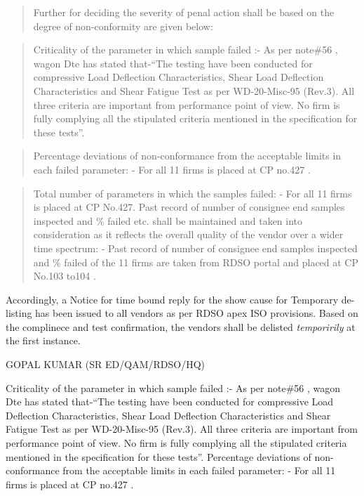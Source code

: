 \documentclass[nofonts,]{tufte-book}
\begin{document}
\begin{quote}
Further for deciding the severity of penal action shall be based on the
degree of non-conformity are given below:
\end{quote}

\begin{quote}
Criticality of the parameter in which sample failed :- As per note\#56 ,
wagon Dte has stated that-``The testing have been conducted for
compressive Load Deflection Characteristics, Shear Load Deflection
Characteristics and Shear Fatigue Test as per WD-20-Misc-95 (Rev.3). All
three criteria are important from performance point of view. No firm is
fully complying all the stipulated criteria mentioned in the
specification for these tests''.
\end{quote}

\begin{quote}
Percentage deviations of non-conformance from the acceptable limits in
each failed parameter: - For all 11 firms is placed at CP no.427 .
\end{quote}

\begin{quote}
Total number of parameters in which the samples failed: - For all 11
firms is placed at CP No.427. Past record of number of consignee end
samples inspected and \% failed etc. shall be maintained and taken into
consideration as it reflects the overall quality of the vendor over a
wider time spectrum: - Past record of number of consignee end samples
inspected and \% failed of the 11 firms are taken from RDSO portal and
placed at CP No.103 to104 .
\end{quote}

Accordingly, a Notice for time bound reply for the show cause for
Temporary de-listing has been issued to all vendors as per RDSO apex ISO
provisions. Based on the complinece and test confirmation, the vendors
shall be delisted \emph{temporirily} at the first instance.

GOPAL KUMAR (SR ED/QAM/RDSO/HQ)

Criticality of the parameter in which sample failed :- As per note\#56 ,
wagon Dte has stated that-``The testing have been conducted for
compressive Load Deflection Characteristics, Shear Load Deflection
Characteristics and Shear Fatigue Test as per WD-20-Misc-95 (Rev.3). All
three criteria are important from performance point of view. No firm is
fully complying all the stipulated criteria mentioned in the
specification for these tests''. Percentage deviations of
non-conformance from the acceptable limits in each failed parameter: -
For all 11 firms is placed at CP no.427 .
\end{document}
